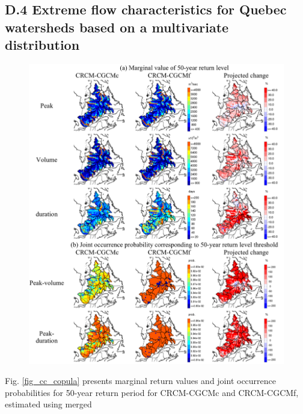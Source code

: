 \documentclass[a0,landscape]{a0poster}
\begin{document}
\begin{multicols*}{4}
\subsection*{D.4 Extreme flow characteristics for Quebec watersheds based on a multivariate distribution}
%
\begin{minipage}[t]{\linewidth}

\begingroup
  \setlength{\columnsep}{30pt}

  \begin{figure}
    \includegraphics[width=\linewidth]{cc_copula}
  \end{figure}
  Fig. \ref{fig_cc_copula} presents marginal return values and joint occurrence probabilities for
  50-year return period for CRCM-CGCMc and CRCM-CGCMf, estimated using merged

\end{minipage}
\end{multicols*}
\end{document}
